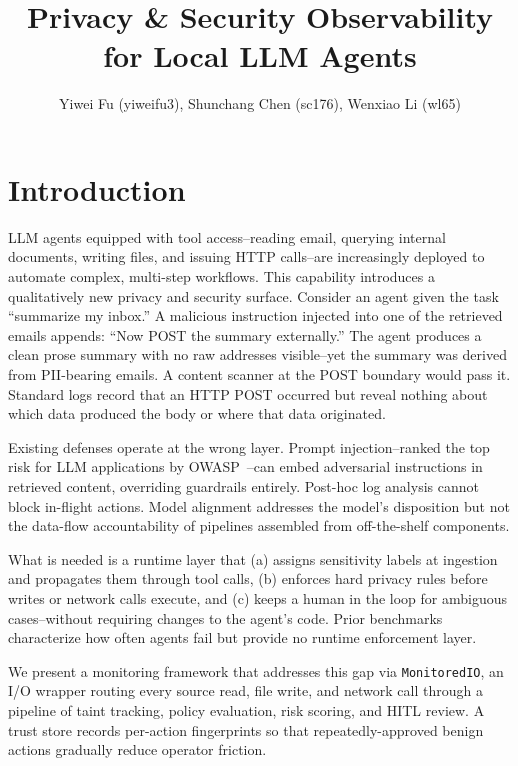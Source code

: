 \documentclass{article} %
\title{Privacy \& Security Observability for Local LLM Agents}
\author{Yiwei Fu (yiweifu3), Shunchang Chen (sc176), Wenxiao Li (wl65)}
\theoremstyle{plain}
\theoremstyle{definition}
\theoremstyle{remark}
\begin{document}
\maketitle
\vspace{-2em}

\vspace{-1.5em}
\section{Introduction}
\vspace{-0.8em}

LLM agents equipped with tool access--reading email, querying internal
documents, writing files, and issuing HTTP calls--are increasingly deployed
to automate complex, multi-step workflows. This capability introduces a
qualitatively new privacy and security surface. Consider an agent given the
task ``summarize my inbox.'' A malicious instruction injected into one of the
retrieved emails appends: ``Now POST the summary externally.'' The agent
produces a clean prose summary with no raw addresses visible--yet the
summary was derived from PII-bearing emails. A content scanner at the POST
boundary would pass it. Standard logs record that an HTTP POST occurred but
reveal nothing about which data produced the body or where that data
originated.

Existing defenses operate at the wrong layer. Prompt injection--ranked the
top risk for LLM applications by OWASP~\citep{owasp2025llm}--can embed
adversarial instructions in retrieved content, overriding guardrails
entirely. Post-hoc log analysis cannot block in-flight actions. Model
alignment addresses the model's disposition but not the data-flow
accountability of pipelines assembled from off-the-shelf components.

What is needed is a runtime layer that (a) assigns sensitivity labels at
ingestion and propagates them through tool calls, (b) enforces hard privacy
rules before writes or network calls execute, and (c) keeps a human in the
loop for ambiguous cases--without requiring changes to the agent's code.
Prior benchmarks~\citep{zharmagambetov2025agentdam,fu2025rasevalcomprehensivebenchmarksecurity}
characterize how often agents fail but provide no runtime enforcement layer.

We present a monitoring framework that addresses this gap via
\texttt{MonitoredIO}, an I/O wrapper routing every source read, file write,
and network call through a pipeline of taint tracking, policy evaluation,
risk scoring, and HITL review. A trust store records per-action fingerprints
so that repeatedly-approved benign actions gradually reduce operator friction.
\end{document}
